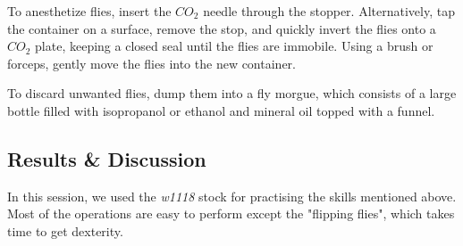 		To anesthetize flies, insert the $CO_{2}$ needle through the stopper. Alternatively, tap the container on a surface, remove the stop, and quickly invert the flies onto a $CO_{2}$ plate, keeping a closed seal until the flies are immobile. Using a brush or forceps, gently move the flies into the new container. \par 
			
		To discard unwanted flies, dump them into a fly morgue, which consists of a large bottle filled with isopropanol or ethanol and mineral oil topped with a funnel. \par 
	
	\subsection{Results \& Discussion} 
		In this session, we used the \textit{w1118} stock for practising the skills mentioned above. Most of the operations are easy to perform except the "flipping flies", which takes time to get dexterity. 
